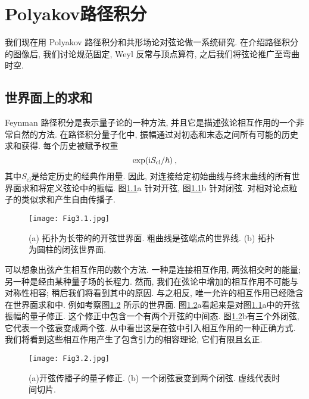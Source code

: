 
\chapter{\texorpdfstring{Polyakov路径积分}{3 The Polyakov path integral}} \label{cha:3}

我们现在用 Polyakov 路径积分和共形场论对弦论做一系统研究. 在介绍路径积分的图像后, 我们讨论规范固定, Weyl 反常与顶点算符, 
之后我们将弦论推广至弯曲时空.

\section{\texorpdfstring{世界面上的求和}{3.1 Sums over world-sheets}} \label{sec:3.2}
Feynman 路径积分是表示量子论的一种方法, 并且它是描述弦论相互作用的一个非常自然的方法. 在路径积分量子化中, 振幅通过对初态和末态之间所有可能的历史求和获得. 每个历史被赋予权重
\begin{equation}
	\exp (\mathrm{i} S_{\mathrm{cl}} / \hbar) \:, \label{3.1.1}
\end{equation}
其中$S_{\mathrm{cl}}$是给定历史的经典作用量. 因此, 对连接给定初始曲线与终末曲线的所有世界面求和将定义弦论中的振幅. 图\ref{Fig3.1}a 针对开弦, 图\ref{Fig3.1}b 针对闭弦. 对相对论点粒子的类似求和产生自由传播子.
\vspace{-0.5cm}
\begin{figure}[h]
	\begin{center}
		\texttt{[image: Fig3.1.jpg]}
\caption{(a) 拓扑为长带的的开弦世界面. 粗曲线是弦端点的世界线. (b) 拓扑为圆柱的闭弦世界面.}\label{Fig3.1}
	\end{center}
\end{figure}

可以想象出弦产生相互作用的数个方法. 一种是连接相互作用, 两弦相交时的能量; 另一种是经由某种量子场的长程力. 然而, 我们在弦论中增加的相互作用不可能与对称性相容; 稍后我们将看到其中的原因. 与之相反, 唯一允许的相互作用已经隐含在世界面求和中. 例如考察图\ref{Fig3.2} 所示的世界面. 图\ref{Fig3.2}a看起来是对图\ref{Fig3.1}a中的开弦振幅的量子修正. 这个修正中包含一个有两个开弦的中间态. 图\ref{Fig3.2}b有三个外闭弦, 它代表一个弦衰变成两个弦. 从中看出这是在弦中引入相互作用的一种正确方式. 我们将看到这些相互作用产生了包含引力的相容理论, 它们有限且幺正.
\begin{figure}[h]
	\begin{center}
		\texttt{[image: Fig3.2.jpg]}\\
\caption{(a)开弦传播子的量子修正. (b) 一个闭弦衰变到两个闭弦. 虚线代表时间切片.}\label{Fig3.2}
	\end{center}
\end{figure}

